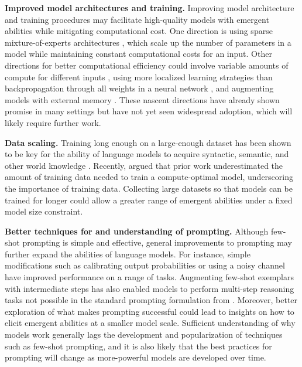 \textbf{Improved model architectures and training.} Improving model architecture and training procedures may facilitate high-quality models with emergent abilities while mitigating computational cost. One direction is using sparse mixture-of-experts architectures \citep{lepikhin2020gshard,fedus2021switch,artetxe2021efficient,zoph2022designing}, which scale up the number of parameters in a model while maintaining constant computational costs for an input. Other directions for better computational efficiency could involve variable amounts of compute for different inputs \citep{graves2016adaptive,dehghani2018universal}, using more localized learning strategies than backpropagation through all weights in a neural network \citep{jaderberg2017decoupled}, and augmenting models with external memory \citep[][\textit{inter alia}]{guu2020realm,borgeaud2021improving,wu2022memorizing}. These nascent directions have already shown promise in many settings but have not yet seen widespread adoption, which will likely require further work.

\textbf{Data scaling.} Training long enough on a large-enough dataset has been shown to be key for the ability of language models to acquire syntactic, semantic, and other world knowledge \citep{zhang-etal-2021-need,wei-etal-2021-frequency,razeghi2022impact}. Recently, \citet{hoffmann2022training} argued that prior work \citep{kaplan2020scaling} underestimated the amount of training data needed to train a compute-optimal model, underscoring the importance of training data. Collecting large datasets so that models can be trained for longer could allow a greater range of emergent abilities under a fixed model size constraint.

\textbf{Better techniques for and understanding of prompting.} Although few-shot prompting \citep{brown2020language} is simple and effective, general improvements to prompting may further expand the abilities of language models. For instance, simple modifications such as calibrating output probabilities \citep{zhao2021calibrate,holtzman-etal-2021-surface} or using a noisy channel \citep{min2021noisy} have improved performance on a range of tasks. Augmenting few-shot exemplars with intermediate steps \citep{reynolds2021prompt,nye2021show,wei2022chain} has also enabled models to perform multi-step reasoning tasks not possible in the standard prompting formulation from \citet{brown2020language}.
Moreover, better exploration of what makes prompting successful \citep{wei2021pretrained,xie2021explanation,min2022rethinking,olsson2022induction} could lead to insights on how to elicit emergent abilities at a smaller model scale. Sufficient understanding of why models work generally lags the development and popularization of techniques such as few-shot prompting, and it is also likely that the best practices for prompting will change as more-powerful models are developed over time.

